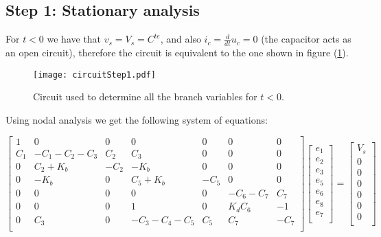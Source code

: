 \subsection{Step 1: Stationary analysis}    
For $t < 0$ we have that $v_s = V_s = C^{te}$, and also $i_c = \frac{d}{dt}u_c = 0 $ (the capacitor acts as an open circuit), therefore the circuit is equivalent to the one shown in figure (\ref{fig: step1}).

\begin{figure}[H] \centering
  \texttt{[image: circuitStep1.pdf]}
  \caption{Circuit used to determine all the branch variables for $t < 0$.}
  \label{fig: step1}
\end{figure}    	
Using nodal analysis we get the following system of equations:
    	
$\begin{bmatrix}
1  &  0 &  0 &  0 & 0 & 0 & 0 \\
C_1 & -C_1-C_2-C_3 & C_2 & C_3 & 0 & 0 & 0\\
0 & C_2+K_b & -C_2 & -K_b & 0 & 0 & 0\\
0 & -K_b & 0 & C_5+K_b & -C_5 & 0 & 0\\
0 & 0 & 0 & 0 & 0 & -C_6-C_7 & C_7\\
0 & 0 & 0 & 1 & 0 & K_d C_6 & -1\\
0 & C_3 & 0 & -C_3-C_4-C_5 & C_5 & C_7 & -C_7\\ 
\end{bmatrix}
\begin{bmatrix}
e_1\\
e_2\\
e_3\\
e_5\\
e_6\\
e_8\\
e_7\\
\end{bmatrix}
=
\begin{bmatrix}
V_s\\
0\\
0\\
0\\
0\\
0\\
0\\
\end{bmatrix}$



